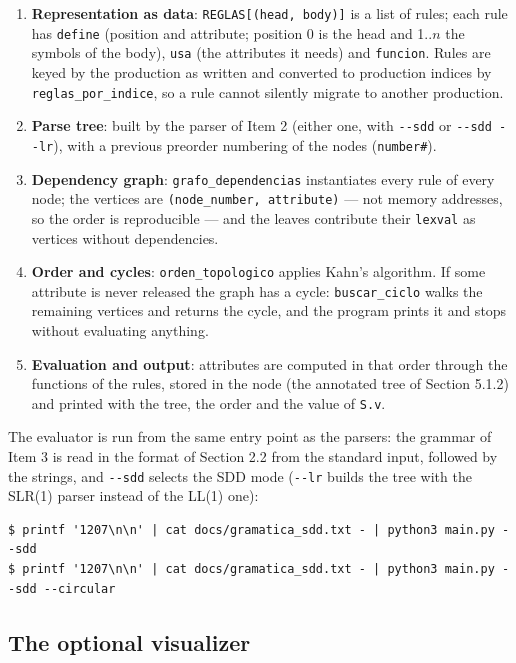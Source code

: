 \documentclass[11pt,letterpaper]{article}
\newcommand{\nt}[1]{\texttt{#1}}
\newcommand{\attr}[1]{\texttt{#1}}
\begin{document}
\begin{enumerate}[leftmargin=1.3em,itemsep=2pt]
\item \textbf{Representation as data}: \nt{REGLAS[(head, body)]} is a list of rules; each rule has
\nt{define} (position and attribute; position 0 is the head and 1..$n$ the symbols of the body),
\nt{usa} (the attributes it needs) and \nt{funcion}. Rules are keyed by the production as written and
converted to production indices by \nt{reglas\_por\_indice}, so a rule cannot silently migrate to
another production.
\item \textbf{Parse tree}: built by the parser of Item 2 (either one, with \nt{-{}-sdd} or
\nt{-{}-sdd -{}-lr}), with a previous preorder numbering of the nodes (\nt{number\#}).
\item \textbf{Dependency graph}: \nt{grafo\_dependencias} instantiates every rule of every node; the
vertices are \nt{(node\_number, attribute)} --- not memory addresses, so the order is reproducible
--- and the leaves contribute their \attr{lexval} as vertices without dependencies.
\item \textbf{Order and cycles}: \nt{orden\_topologico} applies Kahn's algorithm. If some attribute
is never released the graph has a cycle: \nt{buscar\_ciclo} walks the remaining vertices and returns
the cycle, and the program prints it and stops without evaluating anything.
\item \textbf{Evaluation and output}: attributes are computed in that order through the functions of
the rules, stored in the node (the annotated tree of Section 5.1.2) and printed with the tree, the
order and the value of \attr{S.v}.
\end{enumerate}

The evaluator is run from the same entry point as the parsers: the grammar of Item 3 is read in the
format of Section 2.2 from the standard input, followed by the strings, and \nt{-{}-sdd} selects the
SDD mode (\nt{-{}-lr} builds the tree with the SLR(1) parser instead of the LL(1) one):

\begin{lstlisting}[style=consola]
$ printf '1207\n\n' | cat docs/gramatica_sdd.txt - | python3 main.py --sdd
$ printf '1207\n\n' | cat docs/gramatica_sdd.txt - | python3 main.py --sdd --circular
\end{lstlisting}

\subsection{The optional visualizer}
\end{document}
